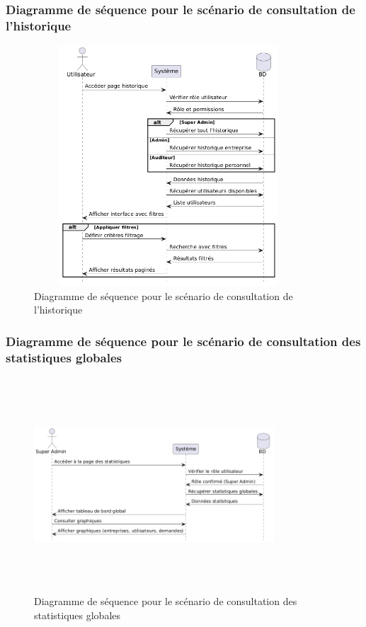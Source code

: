 \subsubsection{Diagramme de séquence pour le scénario de consultation de l'historique}
\begin{figure}[H]
    \centering
    \includegraphics[width=10cm,height=9cm]{images/consulthistoryseq.png}
    \caption{Diagramme de séquence pour le scénario de consultation de l'historique}
\end{figure}


\subsubsection{Diagramme de séquence pour le scénario de consultation des statistiques globales}
\begin{figure}[H]
    \centering
    \includegraphics[width=9cm,height=8cm]{images/consultglobalstatsseq.png}
    \caption{Diagramme de séquence pour le scénario de consultation des statistiques globales}
\end{figure}

